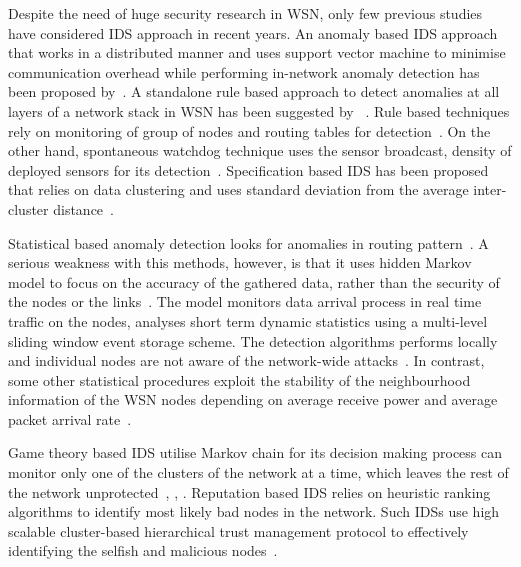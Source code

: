 \documentclass[conference,manuscript]{IEEEtran}
\begin{document}
Despite the need of huge security research in WSN, only few previous studies have considered IDS approach in recent years.
An anomaly based IDS approach that works in a distributed manner and uses support vector machine to minimise communication overhead while performing in-network anomaly detection has been proposed by~\cite{ISI:000257882502160}.
A standalone rule based approach to detect anomalies at all layers of a network stack in WSN has been suggested by ~\cite{ISI:000232429900067}.
Rule based  techniques rely on monitoring of group of nodes and routing tables for detection~\cite{ISI:000298891500099, Chen:2009:NMI:1516241.1516282, 1424814, Strikos_afull}.
On the other hand, spontaneous watchdog technique uses the sensor broadcast, density of deployed sensors for its detection~\cite{1593102}.
Specification based  IDS has been proposed that relies on data clustering and uses standard deviation from the average inter-cluster distance~\cite{Chen:2009:NMI:1516241.1516282, 1424814, Strikos_afull, 4085803}.
 
Statistical based anomaly  detection looks for anomalies in routing pattern~\cite{4024996}.
A serious weakness with this methods, however, is that  it uses hidden Markov model to focus on the accuracy of the gathered data, rather than the security of the nodes or the links~\cite{1290173}.
The model monitors data arrival process in real time traffic on the nodes, analyses short term dynamic statistics using a multi-level sliding window event storage scheme.%
The detection algorithms performs locally and individual nodes are not aware of the network-wide attacks~\cite{1515559}.
In contrast, some other statistical procedures exploit the stability of the neighbourhood information of the WSN nodes depending on average receive power and average packet arrival rate~\cite{1512911}.

Game theory based IDS utilise Markov chain for its decision making process can monitor only one of the clusters of the network at a time, which leaves the rest of the network unprotected~\cite{1347798}, \cite{Das07preventingdos}, \cite{Reddy:2009:GTA:1607720.1607944}.
Reputation based IDS relies on heuristic ranking algorithms to identify most likely bad nodes in the network.
Such IDSs use high scalable cluster-based hierarchical trust management protocol to effectively identifying the selfish and malicious nodes~\cite{6174485}.
\end{document}
